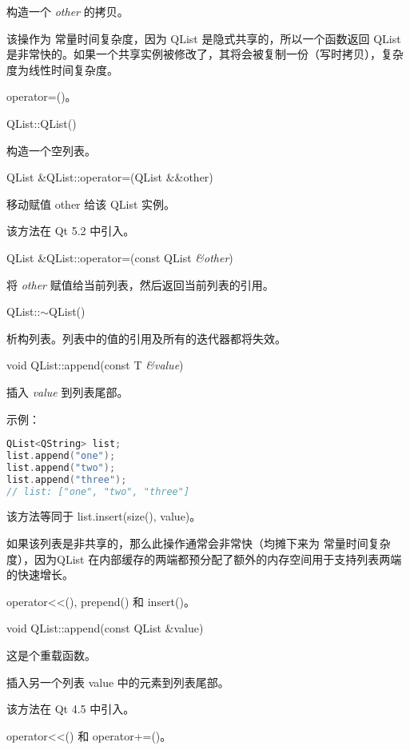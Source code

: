 构造一个 \emph{other} 的拷贝。

该操作为 常量时间复杂度，因为 QList 是隐式共享的，所以一个函数返回 QList 是非常快的。如果一个共享实例被修改了，其将会被复制一份（写时拷贝），复杂度为线性时间复杂度。

\begin{notice}[另请参阅]
operator=()。
\end{notice}

QList::QList()

构造一个空列表。

QList \&QList::operator=(QList \&\&other)

移动赋值 other 给该 QList 实例。

该方法在 Qt 5.2 中引入。

QList \&QList::operator=(const QList \emph{\&other})

将 \emph{other} 赋值给当前列表，然后返回当前列表的引用。

QList::$\sim$QList()

析构列表。列表中的值的引用及所有的迭代器都将失效。

void QList::append(const T \emph{\&value})

插入 \emph{value} 到列表尾部。

示例：

\begin{lstlisting}[language=C++]
QList<QString> list;
list.append("one");
list.append("two");
list.append("three");
// list: ["one", "two", "three"]
\end{lstlisting}

该方法等同于 list.insert(size(), value)。

如果该列表是非共享的，那么此操作通常会非常快（均摊下来为 常量时间复杂度），因为QList 在内部缓存的两端都预分配了额外的内存空间用于支持列表两端的快速增长。




\begin{notice}[另请参阅]
operator<<(), prepend() 和 insert()。
\end{notice}



void QList::append(const QList \&value)

这是个重载函数。

插入另一个列表 value 中的元素到列表尾部。

该方法在 Qt 4.5 中引入。

\begin{notice}[另请参阅]
 operator<<() 和 operator+=()。
\end{notice}


